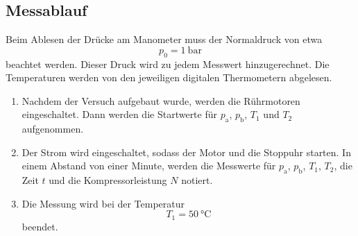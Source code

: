 \subsection{Messablauf}

Beim Ablesen der Drücke am Manometer muss der Normaldruck von etwa
\begin{equation}
  p_0 = \SI{1}{\bar}
\end{equation}
beachtet werden. Dieser Druck wird zu jedem Messwert hinzugerechnet.
Die Temperaturen werden von den jeweiligen digitalen Thermometern abgelesen.

\begin{enumerate}

\item Nachdem der Versuch aufgebaut wurde, werden die Rührmotoren eingeschaltet.
Dann werden die Startwerte für $p_\text{a}$, $p_\text{b}$, $T_1$ und $T_2$
aufgenommen.

\item Der Strom wird eingeschaltet, sodass der Motor und die Stoppuhr starten.
In einem Abstand von einer Minute, werden die Messwerte für $p_\text{a}$,
$p_\text{b}$, $T_1$, $T_2$, die Zeit $t$ und die Kompressorleistung $N$ notiert.

\item Die Messung wird bei der Temperatur
\begin{equation}
  T_1 = \SI{50}{\celsius}
\end{equation}
beendet.

\end{enumerate}
